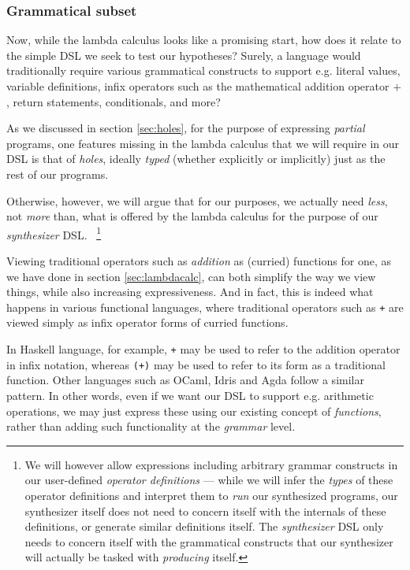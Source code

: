 \documentclass{article}
\begin{document}
\subsubsection{Grammatical subset}

Now, while the lambda calculus looks like a promising start,
how does it relate to the simple DSL we seek to test our hypotheses?
Surely, a language would traditionally require various grammatical constructs to support e.g.
literal values, variable definitions, infix operators such as the mathematical addition operator $+$, return statements, conditionals, and more?

As we discussed in section \ref{sec:holes},
for the purpose of expressing \emph{partial} programs,
one features missing in the lambda calculus that we will require in our DSL is that of \emph{holes},
ideally \emph{typed} (whether explicitly or implicitly) just as the rest of our programs.

Otherwise, however, we will argue that for our purposes,
we actually need \emph{less},
not \emph{more} than,
what is offered by the lambda calculus for the purpose of our \emph{synthesizer} DSL.%
~\footnote{
    We will however allow expressions including arbitrary grammar constructs in our user-defined \emph{operator definitions} ---
    while we will infer the \emph{types} of these operator definitions and interpret them to \emph{run} our synthesized programs,
    our synthesizer itself does not need to concern itself with the internals of these definitions,
    or generate similar definitions itself.
    The \emph{synthesizer} DSL only needs to concern itself with the grammatical constructs that our synthesizer will actually be tasked with \emph{producing} itself.
}


Viewing traditional operators such as \emph{addition} as (curried) functions for one,
as we have done in section \ref{sec:lambdacalc},
can both simplify the way we view things,
while also increasing expressiveness.
And in fact, this is indeed what happens in various functional languages,
where traditional operators such as \verb|+| are viewed simply as infix operator forms of curried functions.

In Haskell language, for example, \verb|+| may be used to refer to the addition operator in infix notation,
whereas \verb|(+)| may be used to refer to its form as a traditional function.
Other languages such as OCaml, Idris and Agda follow a similar pattern.
In other words, even if we want our DSL to support e.g. arithmetic operations,
we may just express these using our existing concept of \emph{functions},
rather than adding such functionality at the \emph{grammar} level.
\end{document}
